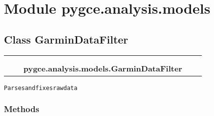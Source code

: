 %
%
%


\section{Module pygce.analysis.models}

    \label{pygce:analysis:models}


\subsection{Class GarminDataFilter}

    \label{pygce:analysis:models:GarminDataFilter}
\begin{tabular}{cccccc}
\multicolumn{2}{r}{\settowidth{\BCL}{object}\multirow{2}{\BCL}{object}}
&&
  \\\cline{3-3}
  &&\multicolumn{1}{c|}{}
&&
  \\
&&\multicolumn{2}{l}{\textbf{pygce.analysis.models.GarminDataFilter}}
\end{tabular}

\begin{alltt}
Parses and fixes raw data 
\end{alltt}



  \subsubsection{Methods}


